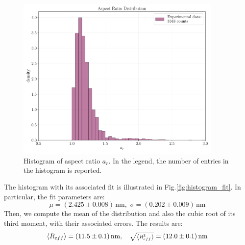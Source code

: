 \documentclass[prb,twocolumn]{revtex4-1}
\begin{document}
\begin{figure}[t!]
    \begin{minipage}[l]{1.0\columnwidth}
    \centering
    \includegraphics[width=0.9\textwidth]{images/sem/histogram_ar.pdf}
    \caption{Histogram of aspect ratio $a_{r}$. In the legend, the number of entries in the histogram is reported.}
    \label{fig:histogram_ar}
    \end{minipage}
\end{figure}

The histogram with its associated fit is illustrated in Fig.\ref{fig:histogram_fit}. In particular, the fit parameters are:
\begin{equation*}
    \mu=(2.425 \pm 0.008)\, \text{nm},  \,\, \sigma=(0.202\pm0.009) \, \text{nm}
\end{equation*}
Then, we compute the mean of the distribution and also the cubic root of its third moment, with their associated errors. The results are:
\begin{equation*}
   \expval{R_{eff}} = (11.5 \pm 0.1) \, \text{nm}, \quad {\scriptstyle \sqrt{\expval{R_{eff}^3}} }=(12.0\pm0.1) \, \text{nm}
\end{equation*}
\end{document}
